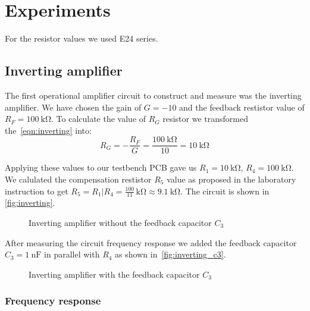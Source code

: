 \section{Experiments}\label{sec:experiments}

For the resistor values we used E24 series.

\subsection{Inverting amplifier}\label{sec:inverting}

The first operational amplifier circuit to construct and measure was the
inverting amplifier. We have chosen the gain of $G=-10$ and the feedback
restistor value of $R_F=\qty{100}{\kilo\ohm}$. To calculate the value of $R_G$
resistor we transformed the~\autoref{eqn:inverting} into:
\begin{equation}
  R_G = -\frac{R_F}{G} = \frac{\qty{100}{\kilo\ohm}}{10} = \qty{10}{\kilo\ohm}
\end{equation}

Applying these values to our testbench PCB gave us $R_1=\qty{10}{\kilo\ohm}$,
$R_4=\qty{100}{\kilo\ohm}$. We calulated the compensation restistor $R_5$ value
as proposed in the laboratory instruction to get
$R_5=R_1|R_4=\frac{100}{11}\,\unit{\kilo\ohm} \approx \qty{9.1}{\kilo\ohm}$.
The circuit is shown in \autoref{fig:inverting}.

\begin{figure}[ht]
  \centering
  
  \caption{Inverting amplifier without the feedback capacitor $C_3$}
  \label{fig:inverting}
\end{figure}

After measuring the circuit frequency response we added the feedback capacitor
$C_3=\qty{1}{\nano\farad}$ in parallel with $R_4$ as shown
in~\autoref{fig:inverting_c3}.

\begin{figure}[ht]
  \centering
  
  \caption{Inverting amplifier with the feedback capacitor $C_3$}
  \label{fig:inverting_c3}
\end{figure}


\subsubsection{Frequency response}

